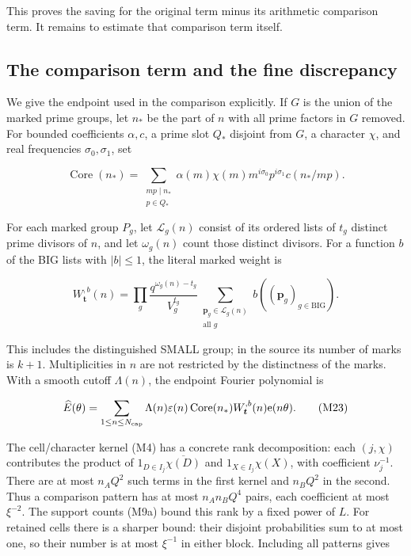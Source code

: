 This proves the saving for the original term minus its arithmetic
comparison term. It remains to estimate that comparison term itself.


\hypertarget{marked-correlation-the-comparison-term-and-the-fine-discrepancy}{%
\subsection{The comparison term and the fine
discrepancy}\label{marked-correlation-the-comparison-term-and-the-fine-discrepancy}}

We give the endpoint used in the comparison explicitly. If \(G\) is the
union of the marked prime groups, let \(n_*\) be the part of \(n\) with
all prime factors in \(G\) removed. For bounded coefficients
\(\alpha,c\), a prime slot \(Q_*\) disjoint from \(G\), a character
\(\chi\), and real frequencies \(\sigma_0,\sigma_1\), set

\[
\operatorname{Core}(n_*)=
 \sum_{\substack{m p\mid n_*\\p\in Q_*}}
 \alpha(m)\chi(m)m^{i\sigma_0}p^{i\sigma_1}c(n_*/mp).
 \tag{M21}
\]

For each marked group \(P_g\), let \(\mathcal L_g(n)\) consist of its
ordered lists of \(t_g\) distinct prime divisors of \(n\), and let
\(\omega_g(n)\) count those distinct divisors. For a function \(b\) of
the BIG lists with \(|b|\le1\), the literal marked weight is

\[
W_{\boldsymbol t}^{,b}(n)=
 \prod_g\frac{q^{\omega_g(n)-t_g}}{V_g^{t_g}}
 \sum_{\substack{\boldsymbol p_g\in\mathcal L_g(n)\\\text{all }g}}
 b((\boldsymbol p_g)_{g\in\mathrm{BIG}}). \tag{M22}
\]

This includes the distinguished SMALL group; in the source its number of
marks is \(k+1\). Multiplicities in \(n\) are not restricted by the
distinctness of the marks. With a smooth cutoff \(\Lambda(n)\), the
endpoint Fourier polynomial is

\[
\widehat E(\theta)=\sum_{1\le n\le N_{\rm cap}}
 \Lambda(n)\varepsilon(n)\operatorname{Core}(n_*)
 W_{\boldsymbol t}^{,b}(n)\mathrm e(n\theta). \tag{M23}
\]

The cell/character kernel (M4) has a concrete rank decomposition: each
\((j,\chi)\) contributes the product of
\(1_{D\in I_j}\overline{\chi(D)}\) and \(1_{X\in I_j}\chi(X)\), with
coefficient \(\nu_j^{-1}\). There are at most \(n_AQ^2\) such terms in
the first kernel and \(n_BQ^2\) in the second. Thus a comparison pattern
has at most \(n_An_BQ^4\) pairs, each coefficient at most \(\xi^{-2}\).
The support counts (M9a) bound this rank by a fixed power of \(L\). For
retained cells there is a sharper bound: their disjoint probabilities
sum to at most one, so their number is at most \(\xi^{-1}\) in either
block. Including all patterns gives

